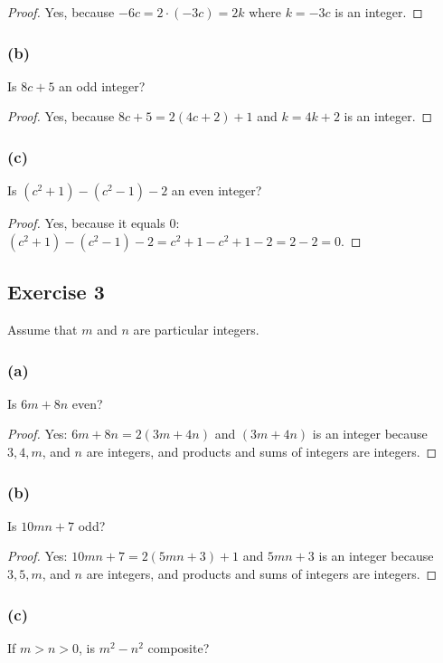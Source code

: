 \documentclass[14pt]{extarticle}
\begin{document}
\begin{proof}
Yes, because $-6c = 2 \cdot (-3c) = 2k$ where $k = -3c$ is an integer.
\end{proof}

\subsubsection{(b)}
Is $8c + 5$ an odd integer?

\begin{proof}
Yes, because $8c + 5 = 2(4c + 2) + 1$ and $k = 4k+2$ is an integer.
\end{proof}

\subsubsection{(c)}
Is $(c^2 + 1) - (c^2 - 1) - 2$ an even integer?

\begin{proof}
Yes, because it equals 0: $(c^2 + 1) - (c^2 - 1) - 2 = c^2 + 1 - c^2 + 1 - 2 = 2 - 2 = 0$.
\end{proof}

\subsection{Exercise 3}
Assume that $m$ and $n$ are particular integers.

\subsubsection{(a)}
Is $6m + 8n$ even?

\begin{proof}
Yes: $6m + 8n = 2(3m + 4n)$ and $(3m + 4n)$ is an integer because $3, 4, m$, and $n$ are integers, and products and sums of integers are integers.
\end{proof}

\subsubsection{(b)}
Is $10mn + 7$ odd?

\begin{proof}
Yes: $10mn + 7 = 2(5mn + 3) + 1$ and $5mn + 3$ is an integer because $3, 5, m$, and $n$ are integers, and products and sums of integers are integers.
\end{proof}

\subsubsection{(c)}
If $m > n > 0$, is $m^2 - n^2$ composite?
\end{document}
